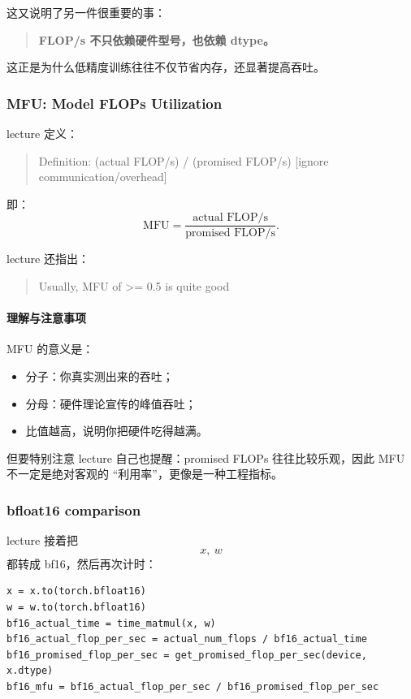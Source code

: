 \documentclass[a4paper,UTF8]{article}
\numberwithin{equation}{section}
\begin{document}
这又说明了另一件很重要的事：

\begin{quote}
\textbf{FLOP/s 不只依赖硬件型号，也依赖 dtype。}
\end{quote}

这正是为什么低精度训练往往不仅节省内存，还显著提高吞吐。

\subsubsection{MFU: Model FLOPs Utilization}

lecture 定义：
\begin{quote}
Definition: (actual FLOP/s) / (promised FLOP/s) [ignore communication/overhead]
\end{quote}

即：
\[
\mathrm{MFU} = \frac{\text{actual FLOP/s}}{\text{promised FLOP/s}}.
\]

lecture 还指出：
\begin{quote}
Usually, MFU of >= 0.5 is quite good
\end{quote}

\paragraph{理解与注意事项}
MFU 的意义是：
\begin{itemize}
    \item 分子：你真实测出来的吞吐；
    \item 分母：硬件理论宣传的峰值吞吐；
    \item 比值越高，说明你把硬件吃得越满。
\end{itemize}

但要特别注意 lecture 自己也提醒：promised FLOPs 往往比较乐观，因此 MFU 不一定是绝对客观的 ``利用率''，更像是一种工程指标。

\subsubsection{bfloat16 comparison}

lecture 接着把
\[
x,\ w
\]
都转成 bf16，然后再次计时：
\begin{verbatim}
x = x.to(torch.bfloat16)
w = w.to(torch.bfloat16)
bf16_actual_time = time_matmul(x, w)
bf16_actual_flop_per_sec = actual_num_flops / bf16_actual_time
bf16_promised_flop_per_sec = get_promised_flop_per_sec(device, x.dtype)
bf16_mfu = bf16_actual_flop_per_sec / bf16_promised_flop_per_sec
\end{verbatim}
\end{document}
